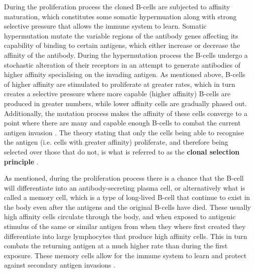 During the proliferation process the cloned B-cells are subjected to affinity maturation, which constitutes some somatic hypermuation \cite{AIS:ClonalSelection} along with strong selective pressure that allows the immune system to learn. Somatic hypermutation mutate the variable regions of the antibody genes affecting its capability of binding to certain antigens, which either increase or decrease the affinity of the antibody. During the hypermutation process the B-cells undergo a stochastic alteration of their receptors in an attempt to generate antibodies of higher affinity specialising on the invading antigen. As mentioned above, B-cells of higher affinity are stimulated to proliferate at greater rates, which in turn creates a selective pressure where more capable (higher affinity) B-cells are produced in greater numbers, while lower affinity cells are gradually phased out. Additionally, the mutation process makes the affinity of these cells converge to a point where there are many and capable enough B-cells to combat the current antigen invasion \cite{AIS:Timmis2004}. The theory stating that only the cells being able to recognise the antigen (i.e. cells with greater affinity) proliferate, and therefore being selected over those that do not, is what is referred to as the \textbf{clonal selection principle} \cite{AIS:BackgroundBook}.

As mentioned, during the proliferation process there is a chance that the B-cell will differentiate into an antibody-secreting plasma cell, or alternatively what is called a memory cell, which is a type of long-lived B-cell that continue to exist in the body even after the antigens and the original B-cells have died. These usually high affinity cells circulate through the body, and when exposed to antigenic stimulus of the same or similar antigen from when they where first created they differentiate into large lymphocytes that produce high affinity cells. This in turn combats the returning antigen at a much higher rate than during the first exposure. These memory cells allow for the immune system to learn and protect against secondary antigen invasions \cite{AIS:Timmis2004}.

